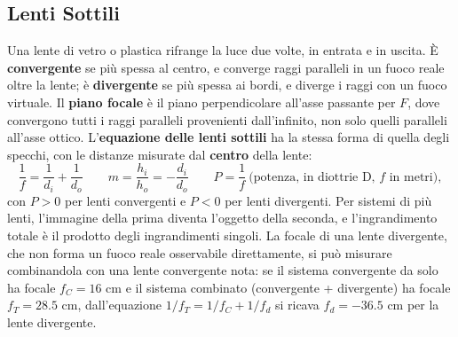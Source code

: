 \documentclass[a4paper,11pt]{article}
\begin{document}
\subsection{Lenti Sottili}

Una lente di vetro o plastica rifrange la luce due volte, in entrata e in uscita. È \textbf{convergente} se più spessa al centro, e converge raggi paralleli in un fuoco reale oltre la lente; è \textbf{divergente} se più spessa ai bordi, e diverge i raggi con un fuoco virtuale. Il \textbf{piano focale} è il piano perpendicolare all'asse passante per $F$, dove convergono tutti i raggi paralleli provenienti dall'infinito, non solo quelli paralleli all'asse ottico. L'\textbf{equazione delle lenti sottili} ha la stessa forma di quella degli specchi, con le distanze misurate dal \textbf{centro} della lente:
\[
\frac{1}{f} = \frac{1}{d_i}+\frac{1}{d_o} \qquad m = \frac{h_i}{h_o} = -\frac{d_i}{d_o} \qquad P = \frac{1}{f}\ \text{(potenza, in diottrie D, $f$ in metri)},
\]
con $P>0$ per lenti convergenti e $P<0$ per lenti divergenti. Per sistemi di più lenti, l'immagine della prima diventa l'oggetto della seconda, e l'ingrandimento totale è il prodotto degli ingrandimenti singoli. La focale di una lente divergente, che non forma un fuoco reale osservabile direttamente, si può misurare combinandola con una lente convergente nota: se il sistema convergente da solo ha focale $f_C=16$ cm e il sistema combinato (convergente + divergente) ha focale $f_T=28.5$ cm, dall'equazione $1/f_T=1/f_C+1/f_d$ si ricava $f_d=-36.5$ cm per la lente divergente.

\begin{center}
\end{center}
\end{document}
